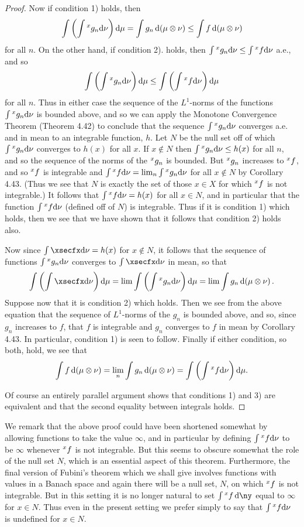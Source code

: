 \begin{proof}
Now if condition 1) holds, then $$\int\br{\int\xsec{g_n}{x}\dd\nu}\dd\mu=\int g_n\dd(\mu\otimes\nu)\leq\int f\dd(\mu\otimes\nu)$$ for all $n$. On the other hand, if condition 2). holds, then $\int\xsec{g_n}{x}\dd\nu\leq\int\xsec{f}{x}\dd\nu$ a.e., and so $$\int\br{\int\xsec{g_n}{x}\dd\nu}\dd\mu\leq\int\br{\int\xsec{f}{x}\dd\nu}\dd\mu$$ for all $n$. Thus in either case the sequence of the $L^1$-norms of the functions $\int\xsec{g_n}{x}\dd\nu$ is bounded above, and so we can apply the Monotone Convergence Theorem (Theorem 4.42) to conclude that the sequence $\int\xsec{g_n}{x}\dd\nu$ converges a.e. and in mean to an integrable function, $h$. Let $N$ be the null set off of which $\int\xsec{g_n}{x}\dd\nu$ converges to $h(x)$ for all $x$. If $x\notin N$ then $\int\xsec{g_n}{x}\dd\nu\leq h(x)$ for all $n$, and so the sequence of the norms of the $\xsec{g_n}{x}$ is bounded. But $\xsec{g_n}{x}$ increases to $\xsec{f}{x}$, and so $\xsec{f}{x}$ is integrable and $\int\xsec{f}{x}\dd\nu=\lim_n\int\xsec{g_n}{x}\dd\nu$ for all $x\notin N$ by Corollary 4.43. (Thus we see that $N$ is exactly the set of those $x\in X$ for which $\xsec{f}{x}$ is not integrable.) It follows that $\int\xsec{f}{x}\dd\nu=h(x)$ for all $x\in N$, and in particular that the function $\int\xsec{f}{x}\dd\nu$ (defined off of $N$) is integrable. Thus if it is condition 1) which holds, then we see that we have shown that it follows that condition 2) holds also.

Now since $\int\xsecfx\dd\nu=h(x)$ for $x\notin N$, it follows that the sequence of functions $\int\xsec{g_n}x\dd\nu$ converges to $\int\xsecfx\dd\nu$ in mean, so that $$\int\br{\int\xsecfx\dd\nu}\dd\mu=\lim\int\br{\int\xsec{g_n}x\dd\nu}\dd\mu=\lim\int g_n\dd(\mu\otimes\nu).$$ Suppose now that it is condition 2) which holds. Then we see from the above equation that the sequence of $L^1$-norms of the $g_n$ is bounded above, and so, since $g_n$ increases to $f$, that $f$ is integrable and $g_n$ converges to $f$ in mean by Corollary 4.43. In particular, condition 1) is seen to follow. Finally if either condition, so both, hold, we see that $$\int f\dd(\mu\otimes\nu)=\lim_n\int g_n\dd(\mu\otimes\nu)=\int\br{\int\xsec{f}{x}\dd\nu}\dd\mu.$$

Of course an entirely parallel argument shows that conditions 1) and 3) are equivalent and that the second equality between integrals holds.
\end{proof}

We remark that the above proof could have been shortened somewhat by allowing functions to take the value $\infty$, and in particular by defining $\int\xsec{f}{x}\dd\nu$ to be $\infty$ whenever $\xsec{f}{x}$ is not integrable. But this seems to obscure somewhat the role of the null set $N$, which is an essential aspect of this theorem. Furthermore, the final version of Fubini's theorem which we shall give involves functions with values in a Banach space and again there will be a null set, $N$, on which $\xsec{f}{x}$ is not integrable. But in this setting it is no longer natural to set $\int\xsec{f}{x}\dd\ny$ equal to $\infty$ for $x\in N$. Thus even in the present setting we prefer simply to say that $\int\xsec{f}{x}\dd\nu$ is undefined for $x\in N$.

